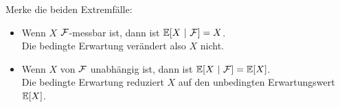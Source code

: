 \begin{bemerkung}
Merke die beiden Extremfälle:
\begin{itemize}
\item Wenn $X$ $\mathcal{F}$-messbar ist, dann ist $\mathbb{E}[X~|~\mathcal{F}]=X$.\\
Die bedingte Erwartung verändert also $X$ nicht.
\item Wenn $X$ von $\mathcal{F}$ unabhängig ist, dann ist $\mathbb{E}[X~|~\mathcal{F}]=\mathbb{E}[X]$.\\
Die bedingte Erwartung reduziert $X$ auf den unbedingten Erwartungswert $\mathbb{E}[X]$.
\end{itemize}
\end{bemerkung}